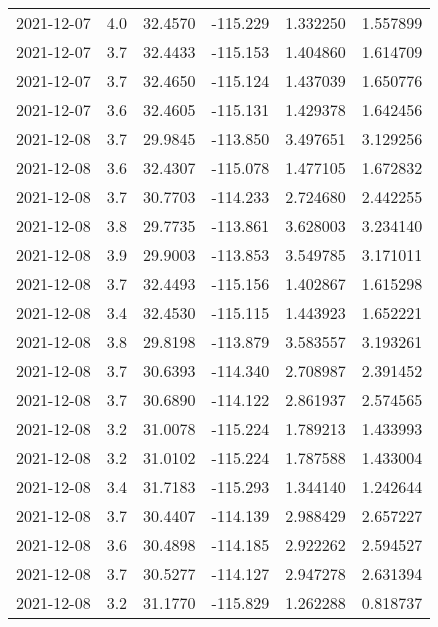 \begin{tabular}{lrrrrr}
2021-12-07 &       4.0 &  32.4570 &  -115.229 &         1.332250 &         1.557899 \\
2021-12-07 &       3.7 &  32.4433 &  -115.153 &         1.404860 &         1.614709 \\
2021-12-07 &       3.7 &  32.4650 &  -115.124 &         1.437039 &         1.650776 \\
2021-12-07 &       3.6 &  32.4605 &  -115.131 &         1.429378 &         1.642456 \\
2021-12-08 &       3.7 &  29.9845 &  -113.850 &         3.497651 &         3.129256 \\
2021-12-08 &       3.6 &  32.4307 &  -115.078 &         1.477105 &         1.672832 \\
2021-12-08 &       3.7 &  30.7703 &  -114.233 &         2.724680 &         2.442255 \\
2021-12-08 &       3.8 &  29.7735 &  -113.861 &         3.628003 &         3.234140 \\
2021-12-08 &       3.9 &  29.9003 &  -113.853 &         3.549785 &         3.171011 \\
2021-12-08 &       3.7 &  32.4493 &  -115.156 &         1.402867 &         1.615298 \\
2021-12-08 &       3.4 &  32.4530 &  -115.115 &         1.443923 &         1.652221 \\
2021-12-08 &       3.8 &  29.8198 &  -113.879 &         3.583557 &         3.193261 \\
2021-12-08 &       3.7 &  30.6393 &  -114.340 &         2.708987 &         2.391452 \\
2021-12-08 &       3.7 &  30.6890 &  -114.122 &         2.861937 &         2.574565 \\
2021-12-08 &       3.2 &  31.0078 &  -115.224 &         1.789213 &         1.433993 \\
2021-12-08 &       3.2 &  31.0102 &  -115.224 &         1.787588 &         1.433004 \\
2021-12-08 &       3.4 &  31.7183 &  -115.293 &         1.344140 &         1.242644 \\
2021-12-08 &       3.7 &  30.4407 &  -114.139 &         2.988429 &         2.657227 \\
2021-12-08 &       3.6 &  30.4898 &  -114.185 &         2.922262 &         2.594527 \\
2021-12-08 &       3.7 &  30.5277 &  -114.127 &         2.947278 &         2.631394 \\
2021-12-08 &       3.2 &  31.1770 &  -115.829 &         1.262288 &         0.818737 \\

\end{tabular}
